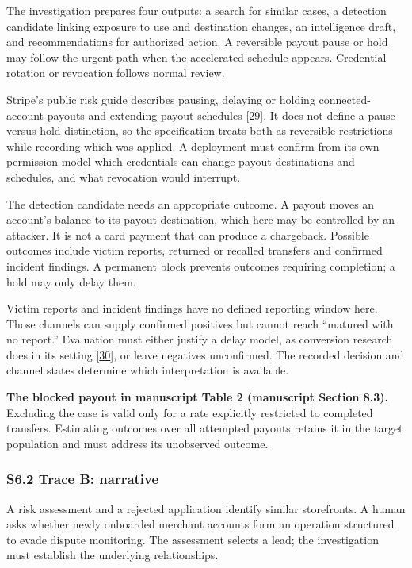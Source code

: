 \documentclass[
  11pt,
]{article}
\begin{document}
The investigation prepares four outputs: a search for similar cases, a
detection candidate linking exposure to use and destination changes, an
intelligence draft, and recommendations for authorized action. A
reversible payout pause or hold may follow the urgent path when the
accelerated schedule appears. Credential rotation or revocation follows
normal review.

Stripe's public risk guide describes pausing, delaying or holding
connected-account payouts and extending payout schedules
{[}\protect\hyperlink{ref-Stripe2026Connect}{29}{]}. It does not define
a pause-versus-hold distinction, so the specification treats both as
reversible restrictions while recording which was applied. A deployment
must confirm from its own permission model which credentials can change
payout destinations and schedules, and what revocation would interrupt.

The detection candidate needs an appropriate outcome. A payout moves an
account's balance to its payout destination, which here may be
controlled by an attacker. It is not a card payment that can produce a
chargeback. Possible outcomes include victim reports, returned or
recalled transfers and confirmed incident findings. A permanent block
prevents outcomes requiring completion; a hold may only delay them.

Victim reports and incident findings have no defined reporting window
here. Those channels can supply confirmed positives but cannot reach
``matured with no report.'' Evaluation must either justify a delay
model, as conversion research does in its setting
{[}\protect\hyperlink{ref-Chapelle2014Delayed}{30}{]}, or leave
negatives unconfirmed. The recorded decision and channel states
determine which interpretation is available.

\textbf{The blocked payout in manuscript Table 2 (manuscript Section
8.3).} Excluding the case is valid only for a rate explicitly restricted
to completed transfers. Estimating outcomes over all attempted payouts
retains it in the target population and must address its unobserved
outcome.

\hypertarget{s6.2-trace-b-narrative}{%
\subsubsection{S6.2 Trace B: narrative}\label{s6.2-trace-b-narrative}}

A risk assessment and a rejected application identify similar
storefronts. A human asks whether newly onboarded merchant accounts form
an operation structured to evade dispute monitoring. The assessment
selects a lead; the investigation must establish the underlying
relationships.
\end{document}
